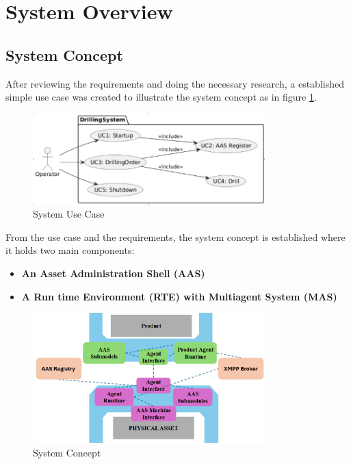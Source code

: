 \section{System Overview}

\subsection{System Concept}
After reviewing the requirements and doing the necessary research,
a established simple use case was created to illustrate the system concept as in figure \ref{fig:usecase}.

\begin{figure}[h]
    \centering
    \includegraphics[width=0.8\textwidth]{Images/Usecase.png}
    \caption{System Use Case}
    \label{fig:usecase}
\end{figure}

From the use case and the requirements, the system concept is established where it holds two
main components:
\begin{itemize}
    \item \textbf{An Asset Administration Shell (AAS)}
    \item \textbf{A Run time Environment (RTE) with Multiagent System (MAS)}
\end{itemize}
\begin{figure}[h]
    \centering
    \includegraphics[width=0.8\textwidth]{Images/System_Concept.png}
    \caption{System Concept}
    \label{fig:system_concept}
\end{figure}

